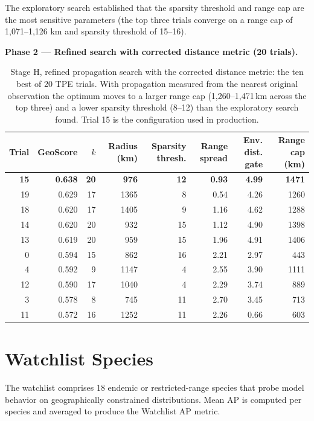 The exploratory search established that the sparsity threshold and range cap are the most sensitive parameters (the top three trials converge on a range cap of 1,071--1,126 km and sparsity threshold of 15--16).

\textbf{Phase 2 --- Refined search with corrected distance metric (20 trials).}

\begin{table}[H]
\centering
\caption{Stage H, refined propagation search with the corrected distance metric: the ten best of 20 TPE trials. With propagation measured from the nearest original observation the optimum moves to a larger range cap (1{,}260--1{,}471\,km across the top three) and a lower sparsity threshold (8--12) than the exploratory search found. Trial 15 is the configuration used in production.}
\label{tab:stage-h2}
\small
\begin{tabular}{rrrrrrrr}
\toprule
Trial & GeoScore & $k$ & Radius (km) & Sparsity thresh. & Range spread & Env. dist. gate & Range cap (km) \\
\midrule
\textbf{15} & \textbf{0.638} & \textbf{20} & \textbf{976} & \textbf{12} & \textbf{0.93} & \textbf{4.99} & \textbf{1471} \\
19 & 0.629 & 17 & 1365 & 8 & 0.54 & 4.26 & 1260 \\
18 & 0.620 & 17 & 1405 & 9 & 1.16 & 4.62 & 1288 \\
14 & 0.620 & 20 & 932 & 15 & 1.12 & 4.90 & 1398 \\
13 & 0.619 & 20 & 959 & 15 & 1.96 & 4.91 & 1406 \\
0 & 0.594 & 15 & 862 & 16 & 2.21 & 2.97 & 443 \\
4 & 0.592 & 9 & 1147 & 4 & 2.55 & 3.90 & 1111 \\
12 & 0.590 & 17 & 1040 & 4 & 2.29 & 3.74 & 889 \\
3 & 0.578 & 8 & 745 & 11 & 2.70 & 3.45 & 713 \\
11 & 0.572 & 16 & 1252 & 11 & 2.26 & 0.66 & 603 \\
\bottomrule
\end{tabular}
\end{table}


\section{Watchlist Species}
\label{sec:C-watchlist-species}

The watchlist comprises 18 endemic or restricted-range species that probe model behavior on geographically constrained distributions. Mean AP is computed per species and averaged to produce the Watchlist AP metric.

